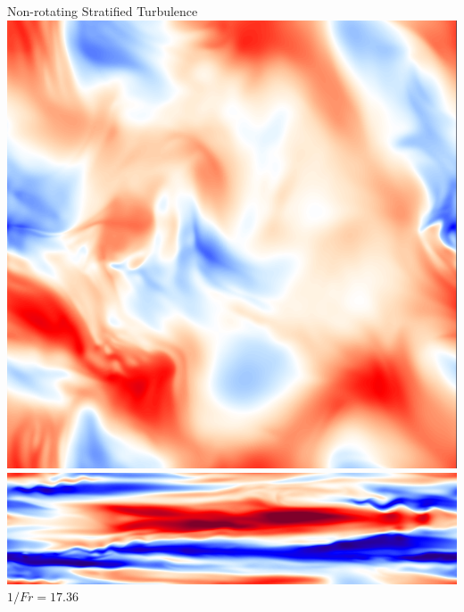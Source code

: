\documentclass[aspecttatio=169]{beamer}
\begin{document}
\begin{frame}{Non-rotating Stratified Turbulence}
        \includegraphics[width=\textwidth]{images/XYB100ux.png}
        \includegraphics[width=\textwidth]{images/XZB100ux.png}
    \emp
    \hspace{1pt}
        \centering
        $1/Fr = 17.36$
        \vspace{2pt}
        

\end{frame}
\end{document}
